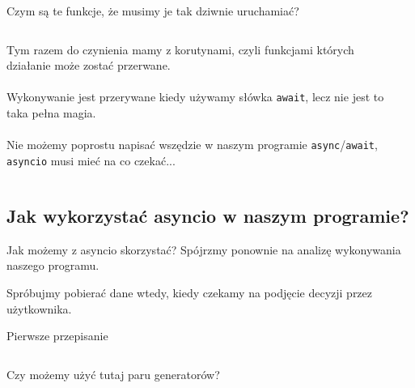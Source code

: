 \documentclass[aspectratio=169]{beamer}
\begin{document}
\begin{frame}{Czym są te funkcje, że musimy je tak dziwnie uruchamiać?}
  \begin{columns}
    \begin{column}{.48 \textwidth}
      Tym razem do czynienia mamy z korutynami, czyli funkcjami których działanie
      może zostać przerwane. \\~\\

      Wykonywanie jest przerywane kiedy używamy słówka
      \texttt{await}, lecz nie jest to taka pełna magia. \\~\\
      
      Nie możemy poprostu napisać wszędzie w naszym programie
      \texttt{async}/\texttt{await}, \texttt{asyncio}
      musi mieć na co czekać...
  

    \end{column}
    
    \begin{column}{.48 \textwidth}
      \scriptsize
      \inputminted[linenos]{python}{./examples/asyncTasks.py}
    \end{column}
  \end{columns}
\end{frame}

\subsection{Jak wykorzystać asyncio w naszym programie?}
\begin{frame}{Jak możemy z asyncio skorzystać?}
  Spójrzmy ponownie na analizę wykonywania naszego programu.
  

  Spróbujmy pobierać dane wtedy, kiedy czekamy na podjęcie decyzji przez
  użytkownika.
\end{frame}

\begin{frame}[fragile]{Pierwsze przepisanie}
  \scriptsize
  \inputminted[linenos]{python}{./examples/asyncProgram.py}
  \pause
  Czy możemy użyć tutaj paru generatorów?
\end{frame}
\end{document}

